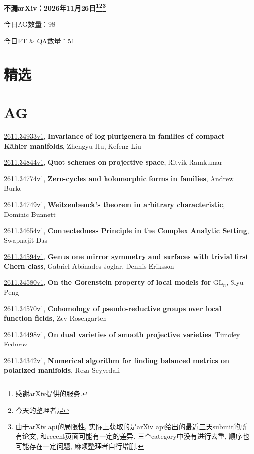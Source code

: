 \documentclass[9pt, a4paper]{article}
\theoremstyle{plain}
\theoremstyle{definition}
\theoremstyle{remark}
\newcommand{\arxiv}[3]{\href{https://arxiv.org/abs/#1}{#1}, \textbf{\textcolor{arxivblue}{#2}}, #3}
\newcommand{\AGnumber}{98}
\newcommand{\RTQAnumber}{51}
\newcommand{\NewestDate}{2026年11月26日}
\newcommand{\todayarXiver}{} %
\begin{document}
\begin{center}
    \Huge\textbf{不漏arXiv：\NewestDate\footnote{感谢arXiv提供的服务.}\footnote{今天的整理者是\todayarXiver}\footnote{由于arXiv api的局限性, 实际上获取的是arXiv api给出的最近三天submit的所有论文, 和recent页面可能有一定的差异. 三个category中没有进行去重, 顺序也可能存在一定问题, 麻烦整理者自行增删.}} \\
\end{center}

\setcounter{section}{-1}

\begin{center}
    今日AG数量：\AGnumber
    
    今日RT \& QA数量：\RTQAnumber
    
\end{center}


\section{精选}


\section{AG}
\arxiv{2611.34933v1}{Invariance of log plurigenera in families of compact Kähler manifolds}{Zhengyu Hu, Kefeng Liu}

\arxiv{2611.34844v1}{Quot schemes on projective space}{Ritvik Ramkumar}

\arxiv{2611.34774v1}{Zero-cycles and holomorphic forms in families}{Andrew Burke}

\arxiv{2611.34749v1}{Weitzenbeock's theorem in arbitrary characteristic}{Dominic Bunnett}

\arxiv{2611.34654v1}{Connectedness Principle in the Complex Analytic Setting}{Swapnajit Das}

\arxiv{2611.34594v1}{Genus one mirror symmetry and surfaces with trivial first Chern class}{Gabriel Abánades-Joglar, Dennis Eriksson}

\arxiv{2611.34580v1}{On the Gorenstein property of local models for $\mathrm{GL}_n$}{Siyu Peng}

\arxiv{2611.34570v1}{Cohomology of pseudo-reductive groups over local function fields}{Zev Rosengarten}

\arxiv{2611.34498v1}{On dual varieties of smooth projective varieties}{Timofey Fedorov}

\arxiv{2611.34342v1}{Numerical algorithm for finding balanced metrics on polarized manifolds}{Reza Seyyedali}
\end{document}
